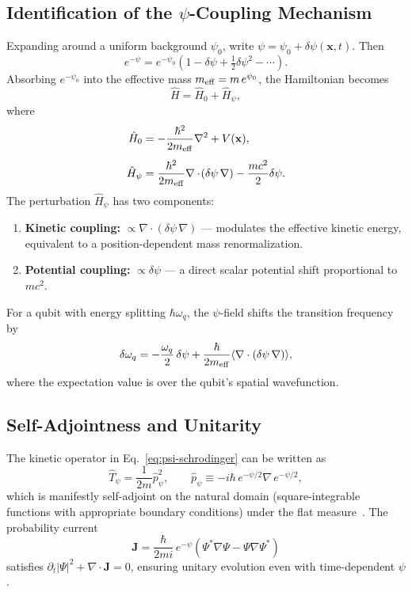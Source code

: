 \documentclass[aps,prd,twocolumn,superscriptaddress,nofootinbib]{revtex4-2}
\begin{document}
\subsection{Identification of the $\psi$-Coupling Mechanism}

Expanding around a uniform background $\psi_0$, write
$\psi = \psi_0 + \delta\psi(\mathbf{x},t)$. Then
\begin{equation}
e^{-\psi} = e^{-\psi_0}\left(1 - \delta\psi + \tfrac{1}{2}\delta\psi^2
- \cdots\right).
\end{equation}
Absorbing $e^{-\psi_0}$ into the effective mass
$m_{\rm eff} = m\,e^{\psi_0}$, the Hamiltonian becomes
\begin{equation}\label{eq:H-expanded}
\hat{H} = \hat{H}_0 + \hat{H}_\psi,
\end{equation}
where
\begin{align}
\hat{H}_0 &= -\frac{\hbar^2}{2m_{\rm eff}}\nabla^2 + V(\mathbf{x}),
\\[4pt]
\hat{H}_\psi &= \frac{\hbar^2}{2m_{\rm eff}}\nabla\cdot
\!\left(\delta\psi\,\nabla\right) - \frac{m c^2}{2}\delta\psi.
\label{eq:H-psi}
\end{align}
The perturbation $\hat{H}_\psi$ has two components:
\begin{enumerate}
\item \textbf{Kinetic coupling:} $\propto \nabla\cdot(\delta\psi\,\nabla)$
--- modulates the effective kinetic energy, equivalent to a
position-dependent mass renormalization.
\item \textbf{Potential coupling:} $\propto \delta\psi$ --- a direct
scalar potential shift proportional to $mc^2$.
\end{enumerate}

For a qubit with energy splitting $\hbar\omega_q$, the $\psi$-field
shifts the transition frequency by
\begin{equation}\label{eq:freq-shift}
\delta\omega_q = -\frac{\omega_q}{2}\,\delta\psi
+ \frac{\hbar}{2m_{\rm eff}}\langle\nabla\cdot(\delta\psi\,\nabla)\rangle,
\end{equation}
where the expectation value is over the qubit's spatial wavefunction.

\subsection{Self-Adjointness and Unitarity}

The kinetic operator in Eq.~\eqref{eq:psi-schrodinger} can be written as
\begin{equation}
\hat{T}_\psi = \frac{1}{2m}\hat{p}_\psi^2, \qquad
\hat{p}_\psi \equiv -i\hbar\,e^{-\psi/2}\nabla\,e^{-\psi/2},
\end{equation}
which is manifestly self-adjoint on the natural domain (square-integrable
functions with appropriate boundary conditions) under the flat
measure~\cite{Alcock2025Penrose}. The probability current
\begin{equation}
\mathbf{J} = \frac{\hbar}{2mi}\,e^{-\psi}\!\left(
\Psi^*\nabla\Psi - \Psi\nabla\Psi^*\right)
\end{equation}
satisfies $\partial_t|\Psi|^2 + \nabla\cdot\mathbf{J} = 0$, ensuring
unitary evolution even with time-dependent $\psi$.
\end{document}
